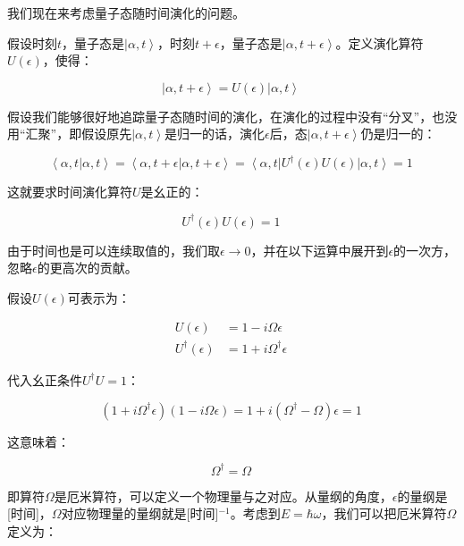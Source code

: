 我们现在来考虑量子态随时间演化的问题。

假设时刻$t$，量子态是$\left| \alpha, t \right\rangle$，时刻$t + \epsilon$，量子态是$\left| \alpha, t+\epsilon \right\rangle$。定义演化算符$U(\epsilon)$，使得：

\begin{equation}
\left| \alpha, t + \epsilon \right\rangle = U(\epsilon ) \left| \alpha, t \right\rangle~
\end{equation}

假设我们能够很好地追踪量子态随时间的演化，在演化的过程中没有“分叉”，也没用“汇聚”，即假设原先$\left| \alpha, t \right\rangle$是归一的话，演化$\epsilon$后，态$\left| \alpha, t + \epsilon \right\rangle$仍是归一的：

\begin{equation}
\left\langle \alpha, t | \alpha, t \right\rangle =  \left\langle \alpha, t + \epsilon | \alpha, t + \epsilon \right\rangle = \left\langle \alpha, t \right| U^\dagger (\epsilon ) U(\epsilon) \left| \alpha, t \right\rangle = 1~
\end{equation}

这就要求时间演化算符$U$是幺正的：

\begin{equation}
U^\dagger (\epsilon) U (\epsilon) = 1~
\end{equation}

由于时间也是可以连续取值的，我们取$\epsilon \to 0$，并在以下运算中展开到$\epsilon$的一次方，忽略$\epsilon$的更高次的贡献。

假设$U(\epsilon) $可表示为：

\begin{align}
U(\epsilon) &= 1 - i \Omega \epsilon \\
U^\dagger (\epsilon) &= 1 + i \Omega^\dagger \epsilon~
\end{align}

代入幺正条件$U^\dagger U =1$：

\begin{equation}
\left( 1+ i \Omega^\dagger \epsilon \right) \left( 1 - i \Omega \epsilon  \right) = 1 + i \left( \Omega^\dagger - \Omega \right) \epsilon = 1~
\end{equation}

这意味着：

\begin{equation}
\Omega^\dagger = \Omega~
\end{equation}

即算符$\Omega$是厄米算符，可以定义一个物理量与之对应。从量纲的角度，$\epsilon$的量纲是[时间]，$\Omega$对应物理量的量纲就是[时间]$^{-1}$。考虑到$E = \hbar \omega$，我们可以把厄米算符$\Omega$定义为：

